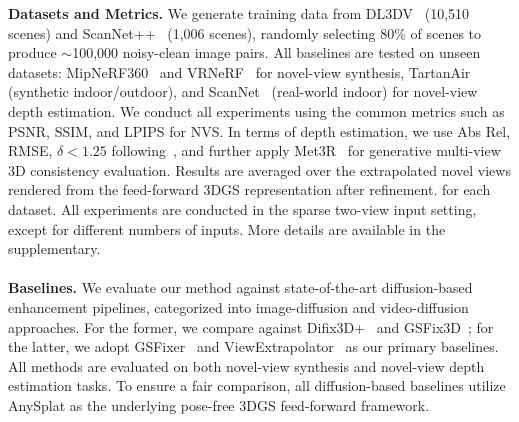 \noindent\textbf{Datasets and Metrics.}
We generate training data from DL3DV~\cite{ling2024dl3dv} (10,510 scenes) and ScanNet++~\cite{yeshwanth2023scannet++} (1,006 scenes), randomly selecting 80\% of scenes to produce $\sim$100,000 noisy-clean image pairs. All baselines are tested on unseen datasets: MipNeRF360~\cite{barron2022mip} and VRNeRF~\cite{xu2023vr} for novel-view synthesis, TartanAir~\cite{wang2020tartanair} (synthetic indoor/outdoor), and ScanNet~\cite{dai2017scannet} (real-world indoor) for novel-view depth estimation.  We conduct all experiments using the common metrics such as PSNR, SSIM, and LPIPS for NVS. In terms of depth estimation, we use Abs Rel, RMSE, $\delta<1.25$ following~\cite{wang2025pi3}, and further apply Met3R~\cite{asim25met3r} for generative multi-view 3D consistency evaluation. Results are averaged over the extrapolated novel views rendered from the feed-forward 3DGS representation after refinement. for each dataset. All experiments are conducted in the sparse two-view input setting, except for different numbers of inputs. More details are available in the supplementary.
\\
\\
\noindent\textbf{Baselines.} We evaluate our method against state-of-the-art diffusion-based enhancement pipelines, categorized into image-diffusion and video-diffusion approaches. For the former, we compare against {Difix3D+}~\cite{wu2025difix3d+} and {GSFix3D}~\cite{wei2025gsfix3d}; for the latter, we adopt {GSFixer}~\cite{yin2025gsfixer} and {ViewExtrapolator}~\cite{viewextrapolator} as our primary baselines. All methods are evaluated on both novel-view synthesis and novel-view depth estimation tasks. To ensure a fair comparison, all diffusion-based baselines utilize AnySplat as the underlying pose-free 3DGS feed-forward framework.
